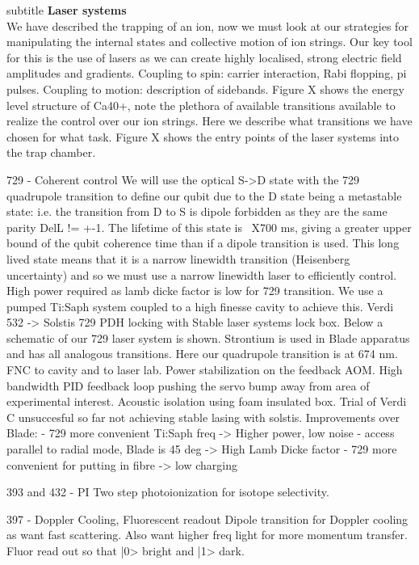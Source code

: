 \documentclass{article}
\begin{document}
subtitle \textbf{Laser systems}\\

We have described the trapping of an ion, now we must look at our
strategies for manipulating the internal states and collective motion
of ion strings. Our key tool for this is the use of lasers as we can
create highly localised, strong electric field amplitudes and
gradients. Coupling to spin: carrier interaction, Rabi flopping, pi
pulses. Coupling to motion: description of sidebands.
Figure X shows the energy level structure of Ca40+, note the plethora
of available transitions available to realize the control over our ion
strings. Here we describe what transitions we have chosen for what
task.
Figure X shows the entry points of the laser systems into the trap
chamber.

729 - Coherent control
We will use the optical S->D state with the 729 quadrupole transition
to define our qubit due to the D state being a metastable state:
i.e. the transition from D to S is dipole forbidden as they are the
same parity DelL != +-1. The lifetime of this state is ~X700 ms,
giving a greater upper bound of the qubit coherence time than if a
dipole transition is used. This long lived state means that it is a
narrow linewidth transition (Heisenberg uncertainty) and so we must
use a narrow linewidth laser to efficiently control.  High power
required as lamb dicke factor is low for 729 transition.  We use a
pumped Ti:Saph system coupled to a high finesse cavity to achieve
this.  Verdi 532 -> Solstis 729 PDH locking with Stable laser systems
lock box. Below a schematic of our 729 laser system is
shown. Strontium is used in Blade apparatus and has all analogous
transitions. Here our quadrupole transition is at 674 nm.  FNC to
cavity and to laser lab. Power stabilization on the feedback AOM. High
bandwidth PID feedback loop pushing the servo bump away from area of
experimental interest. Acoustic isolation using foam insulated box.
Trial of Verdi C unsuccesful so far not achieving stable lasing with
solstis.
Improvements over Blade:
- 729 more convenient Ti:Saph freq -> Higher power, low noise
- access parallel to radial mode, Blade is 45 deg -> High Lamb Dicke
factor
- 729 more convenient for putting in fibre -> low charging


393 and 432 - PI 
Two step photoionization for isotope selectivity.

397 - Doppler Cooling, Fluorescent readout
Dipole transition for Doppler cooling as want fast scattering. Also
want higher freq light for more momentum transfer.
Fluor read out so that |0> bright and |1> dark.
\end{document}
